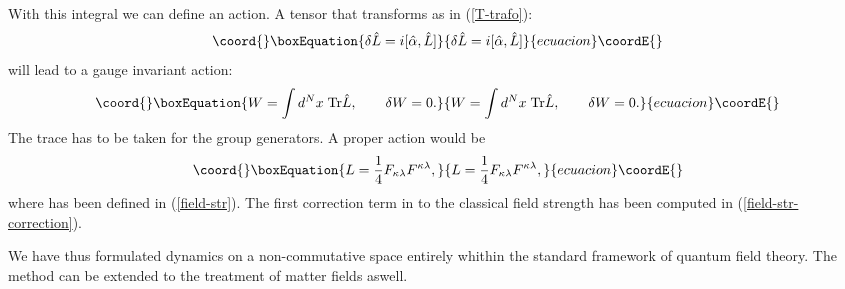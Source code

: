 \documentclass[a4paper,11pt]{article}
\def\la{\lambda}
\def\ka{\kappa}
\begin{document}
With this integral we can define an action. A tensor that transforms as in (\ref{T-trafo}): 
\begin{equation}\coord{}\boxEquation{
  \delta\hat{L}=i[\hat{\alpha},\hat{L}]
}{
  \delta\hat{L}=i[\hat{\alpha},\hat{L}]
}{ecuacion}\coordE{}\end{equation}
will lead to a gauge invariant action:
\begin{equation}\coord{}\boxEquation{
  W=\int d^Nx\; \mbox{Tr}\hat{L},\qquad \delta W=0.
}{
  W=\int d^Nx\; \mbox{Tr}\hat{L},\qquad \delta W=0.
}{ecuacion}\coordE{}\end{equation}
The trace has to be taken for the group generators. A proper action would be 
\begin{equation}\coord{}\boxEquation{
  L=\frac{1}{4}F_{\ka\la}F^{\ka\la},
}{
  L=\frac{1}{4}F_{\ka\la}F^{\ka\la},
}{ecuacion}\coordE{}\end{equation}
where \myHighlight{$F_{\ka\la}$}\coordHE{} has been defined in (\ref{field-str}). 
The first correction term in \myHighlight{$\theta$}\coordHE{} to the classical field strength has been 
computed in (\ref{field-str-correction}). 

We have thus formulated dynamics on a non-commutative space entirely whithin the
standard framework of quantum field theory. The method can be extended to the
treatment of matter fields aswell. 


\end{document}
